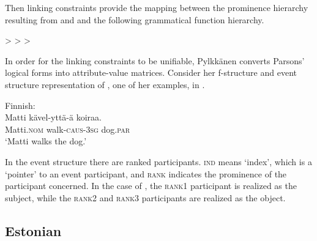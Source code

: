 \documentclass[output=paper,hidelinks]{langscibook}
\begin{document}
          

Then linking constraints provide the mapping between the prominence hierarchy resulting from  and  and the following grammatical function hierarchy. 

\ea%
    \label{ex:FinnoUgric:24}
    \SUBJ > \OBJ > \OBJTHETA > \OBL
    \z

          


In order for the linking constraints to be unifiable, Pylkkänen converts Parsons' logical forms into attribute-value matrices. Consider her f-structure and event structure representation of , one of her examples, in .


\ea%
    \label{ex:FinnoUgric:25}Finnish:\\
    \gll Matti kävel-yttä-ä koiraa.\\
     Matti.\textsc{nom} walk-\textsc{caus-3sg} dog.\textsc{par}   \\
    \glt `Matti walks the dog.'
    \z

In the event structure there are ranked participants. \textsc{ind} means `index', which is a `pointer' to an event participant, and \textsc{rank} indicates the prominence of the participant concerned. In the case of , the \textsc{rank}1 participant is realized as the subject, while the \textsc{rank}2 and \textsc{rank}3 participants are realized as the object.


\subsection{Estonian}
\label{sec:FinnoUgric:6.2}
\end{document}
